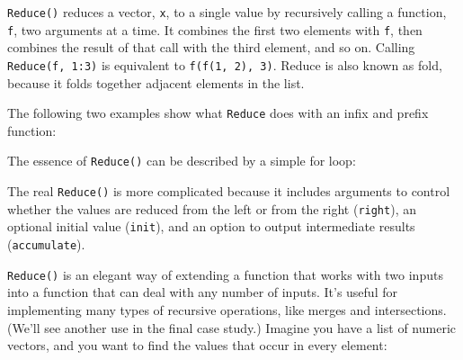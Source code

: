 \texttt{Reduce()} reduces a vector, \texttt{x}, to a single value by
recursively calling a function, \texttt{f}, two arguments at a time. It
combines the first two elements with \texttt{f}, then combines the
result of that call with the third element, and so on. Calling
\texttt{Reduce(f, 1:3)} is equivalent to \texttt{f(f(1, 2), 3)}. Reduce
is also known as fold, because it folds together adjacent elements in
the list.  

The following two examples show what \texttt{Reduce} does with an infix
and prefix function:

\begin{Shaded}
\begin{Highlighting}[]
\NormalTok{(}\DataTypeTok{+}\NormalTok{, }\NormalTok{:}\NormalTok{) }
\NormalTok{:}\NormalTok{) }
\end{Highlighting}
\end{Shaded}

The essence of \texttt{Reduce()} can be described by a simple for loop:

\begin{Shaded}
\begin{Highlighting}[]
\StringTok{ }
  \StringTok{ }\NormalTok{x[[}\NormalTok{]]}
  \NormalTok{(}\NormalTok{, }
    \StringTok{ }
  \NormalTok{\}}
\NormalTok{\}}
\end{Highlighting}
\end{Shaded}

The real \texttt{Reduce()} is more complicated because it includes
arguments to control whether the values are reduced from the left or
from the right (\texttt{right}), an optional initial value
(\texttt{init}), and an option to output intermediate results
(\texttt{accumulate}).

\texttt{Reduce()} is an elegant way of extending a function that works
with two inputs into a function that can deal with any number of inputs.
It's useful for implementing many types of recursive operations, like
merges and intersections. (We'll see another use in the final case
study.) Imagine you have a list of numeric vectors, and you want to find
the values that occur in every element:

